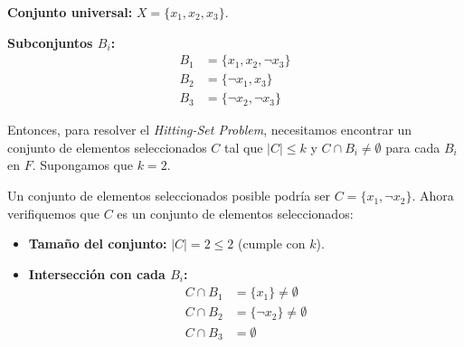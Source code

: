 \documentclass{estilo}
\begin{document}
\begin{minipage}[t]{0.7\textwidth}
    \textbf{Conjunto universal:} \(X = \{x_1, x_2, x_3\}\).

    \vspace{0.5cm}

    \textbf{Subconjuntos \(B_i\):}
    \begin{align*}
        B_1 & = \{x_1, x_2, \neg x_3\} \\
        B_2 & = \{\neg x_1, x_3\} \\
        B_3 & = \{\neg x_2, \neg x_3\}
    \end{align*}
\end{minipage}
\hfill
\begin{minipage}[t]{0.3\textwidth}
\end{minipage}

Entonces, para resolver el \textit{Hitting-Set Problem}, necesitamos encontrar un conjunto de elementos seleccionados \(C\) tal que \(|C| \leq k\) y \(C \cap B_i \neq \emptyset\) para cada \(B_i\) en \(F\). Supongamos que \(k = 2\).

Un conjunto de elementos seleccionados posible podría ser \(C = \{x_1, \neg x_2\}\). Ahora verifiquemos que \(C\) es un conjunto de elementos seleccionados:

\begin{itemize}
    \item \textbf{Tamaño del conjunto:} \(|C| = 2 \leq 2\) (cumple con \(k\)).
    \item \textbf{Intersección con cada \(B_i\):}
        \begin{align*}
            C \cap B_1 & = \{x_1\} \neq \emptyset \\
            C \cap B_2 & = \{\neg x_2\} \neq \emptyset \\
            C \cap B_3 & = \emptyset \quad
        \end{align*}
\end{itemize}
\end{document}

